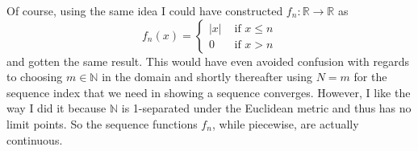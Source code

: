 \documentclass[12pt,twoside]{article}
\newcommand{\R}{\mathbb R} %
\newcommand{\N}{\mathbb N} %
\newenvironment{example}{\noindent {\em Example:} }{\bigskip}
\begin{document}
\begin{enumerate}
\begin{itemize}
\begin{example}
Of course, using the same idea I could have constructed $f_n:\R\to\R$ as
$$f_n(x) = \begin{cases} |x| & \text{ if } x\le n\\
					0 & \text{ if } x>n \end{cases}$$
and gotten the same result. This would have even avoided confusion with regards to choosing $m\in\N$ in the domain and shortly thereafter using $N=m$ for the sequence index that we need in showing a sequence converges. However, I like the way I did it because $\N$ is 1-separated under the Euclidean metric and thus has no limit points. So the sequence functions $f_n$, while piecewise, are actually continuous.\end{example}

\end{itemize}

\end{enumerate}
\end{document}
